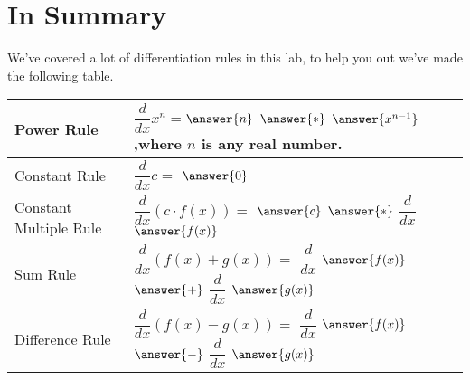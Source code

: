 \documentclass{ximera}
\begin{document}
\section{In Summary}
We've covered a lot of differentiation rules in this lab, to help you out we've made the following table.
\begin{question}
\begin{center}
\renewcommand{\arraystretch}{3}
\begin{tabular}{| l | p{7.5cm} |}
    \hline
    Power Rule & $\dfrac{d}{dx}x^n=$$\answer{n}$ $\answer{*}$ $\answer{x^{n-1}}$,where $n$ is any real number. \\
    \hline
    Constant Rule & $\dfrac{d}{dx}c =$ $\answer{0}$ \\
    \hline
    Constant Multiple Rule & $\dfrac{d}{dx}(c \cdot f(x))=$ $\answer{c}$ $\answer{*}$ $\dfrac{d}{dx}$ $\answer{f(x)}$ \\
    \hline
    Sum Rule & $\dfrac{d}{dx}(f(x)+g(x))=$ $\dfrac{d}{dx}$ $\answer{f(x)}$ $\answer{+}$ $\dfrac{d}{dx}$ $\answer{g(x)}$ \\
    \hline
    Difference Rule & $\dfrac{d}{dx}(f(x)-g(x))=$ $\dfrac{d}{dx}$ $\answer{f(x)}$ $\answer{-}$
    $\dfrac{d}{dx}$ $\answer{g(x)}$ \\
    \hline
\end{tabular}
\end{center}
\end{question}

\pagebreak
\end{document}
